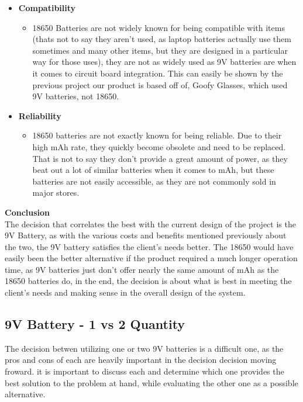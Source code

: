 \documentclass[12pt]{article}
\begin{document}
{\begin{itemize}
\begin{itemize}
							\end{itemize}
							\item \textbf{Compatibility}
							\begin{itemize}
								\item 18650 Batteries are not widely known for being compatible with items (thats not to say they aren't used, as laptop batteries actually use them sometimes and many other items, but they are designed in a particular way for those uses), they are not as widely used as 9V batteries are when it comes to circuit board integration. This can easily be shown by the previous project our product is based off of, Goofy Glasses, which used 9V batteries, not 18650.
							\end{itemize}
							\item \textbf{Reliability}
							\begin{itemize}
								\item 18650 batteries are not exactly known for being reliable. Due to their high mAh rate, they quickly become obsolete and need to be replaced. That is not to say they don't provide a great amount of power, as they beat out a lot of similar batteries when it comes to mAh, but these batteries are not easily accessible, as they are not commonly sold in major stores.
							\end{itemize}
						\end{itemize}
					}
					
					\noindent\textbf{Conclusion}\\
					\indent The decision that correlates the best with the current design of the project is the 9V Battery, as with the various costs and benefits mentioned previously about the two, the 9V battery satisfies the client's needs better. The 18650 would have easily been the better alternative if the product required a much longer operation time, as 9V batteries just don't offer nearly the same amount of mAh as the 18650 batteries do, in the end, the decision is about what is best in meeting the client's needs and making sense in the overall design of the system.
					
				
				\subsection{9V Battery - 1 vs 2 Quantity}
				The decision betwen utilizing one or two 9V batteries is a difficult one, as the pros and cons of each are heavily important in the decision decision moving froward. it is important to discuss each and determine which one provides the best solution to the problem at hand, while evaluating the other one as a possible alternative.
					
\end{document}
